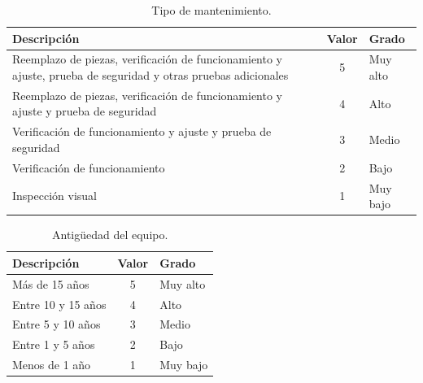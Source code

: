 \documentclass[10pt]{article}
\begin{document}
\begin{table}[H]
    \caption{Tipo de mantenimiento.}
    \label{tab:riesgo-mantenimiento}
    \centering
    \small
    \renewcommand{\arraystretch}{1.3}
    \begin{tabularx}{\textwidth}{>{\raggedright\arraybackslash}X c l}
        \toprule
        \textbf{Descripción} & \textbf{Valor} & \textbf{Grado} \\
        \midrule
        Reemplazo de piezas, verificación de funcionamiento y ajuste, prueba de seguridad y otras pruebas adicionales & 5 & Muy alto \\
        Reemplazo de piezas, verificación de funcionamiento y ajuste y prueba de seguridad & 4 & Alto \\
        Verificación de funcionamiento y ajuste y prueba de seguridad & 3 & Medio \\
        Verificación de funcionamiento & 2 & Bajo \\
        Inspección visual & 1 & Muy bajo \\
        \bottomrule
    \end{tabularx}
\end{table}

\begin{table}[H]
    \caption{Antigüedad del equipo.}
    \label{tab:riesgo-antiguedad}
    \centering
    \small
    \renewcommand{\arraystretch}{1.3}
    \begin{tabularx}{\textwidth}{>{\raggedright\arraybackslash}X c l}
        \toprule
        \textbf{Descripción} & \textbf{Valor} & \textbf{Grado} \\
        \midrule
        Más de 15 años & 5 & Muy alto \\
        Entre 10 y 15 años & 4 & Alto \\
        Entre 5 y 10 años & 3 & Medio \\
        Entre 1 y 5 años & 2 & Bajo \\
        Menos de 1 año & 1 & Muy bajo \\
        \bottomrule
    \end{tabularx}
\end{table}
\end{document}
